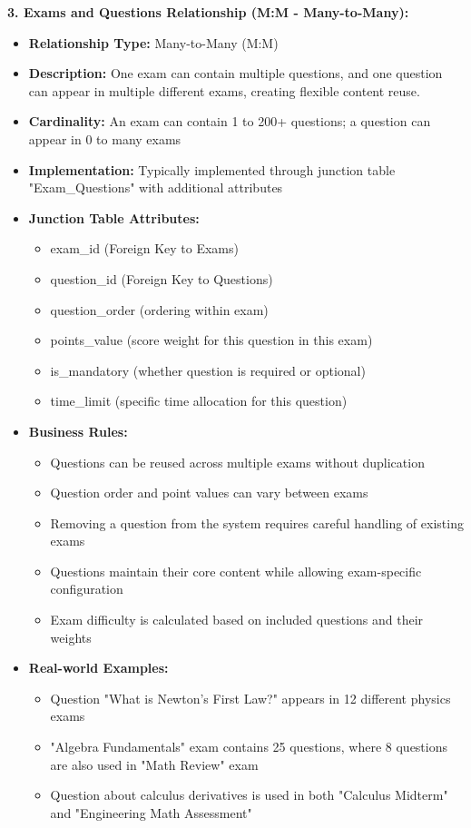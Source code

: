\documentclass[12pt,a4paper,oneside]{book}
\begin{document}
\textbf{3. Exams and Questions Relationship (M:M - Many-to-Many):}
\begin{itemize}
    \item \textbf{Relationship Type:} Many-to-Many (M:M)
    \item \textbf{Description:} One exam can contain multiple questions, and one question can appear in multiple different exams, creating flexible content reuse.
    \item \textbf{Cardinality:} An exam can contain 1 to 200+ questions; a question can appear in 0 to many exams
    \item \textbf{Implementation:} Typically implemented through junction table "Exam\_Questions" with additional attributes
    \item \textbf{Junction Table Attributes:}
        \begin{itemize}
            \item exam\_id (Foreign Key to Exams)
            \item question\_id (Foreign Key to Questions)
            \item question\_order (ordering within exam)
            \item points\_value (score weight for this question in this exam)
            \item is\_mandatory (whether question is required or optional)
            \item time\_limit (specific time allocation for this question)
        \end{itemize}
    \item \textbf{Business Rules:}
        \begin{itemize}
            \item Questions can be reused across multiple exams without duplication
            \item Question order and point values can vary between exams
            \item Removing a question from the system requires careful handling of existing exams
            \item Questions maintain their core content while allowing exam-specific configuration
            \item Exam difficulty is calculated based on included questions and their weights
        \end{itemize}
    \item \textbf{Real-world Examples:}
        \begin{itemize}
            \item Question "What is Newton's First Law?" appears in 12 different physics exams
            \item "Algebra Fundamentals" exam contains 25 questions, where 8 questions are also used in "Math Review" exam
            \item Question about calculus derivatives is used in both "Calculus Midterm" and "Engineering Math Assessment"
        \end{itemize}
\end{itemize}
\end{document}
